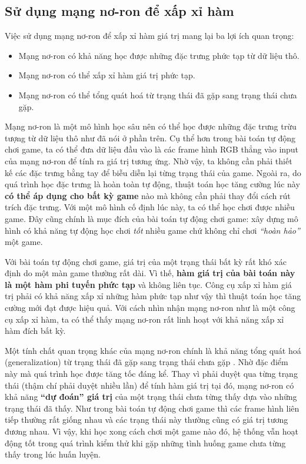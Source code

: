 \subsection{Sử dụng mạng nơ-ron để xấp xỉ hàm}
	Việc sử dụng mạng nơ-ron để xấp xỉ hàm giá trị mang lại ba lợi ích quan trọng:
	\begin{itemize}
		\item Mạng nơ-ron có khả năng học được những đặc trưng phức tạp từ dữ liệu thô.
		\item Mạng nơ-ron có thể xấp xỉ hàm giá trị phức tạp.
		\item Mạng nơ-ron có thể tổng quát hoá từ trạng thái đã gặp sang trạng thái chưa gặp.
	\end{itemize}
	
	Mạng nơ-ron là một mô hình học sâu nên có thể học được những đặc trưng trừu tượng từ dữ liệu thô như đã nói ở phần trên.
	Cụ thể hơn trong bài toán tự động chơi game, ta có thể đưa dữ liệu đầu vào là các frame hình RGB thẳng vào input của mạng nơ-ron để tính ra giá trị tương ứng.
	Nhờ vậy, ta không cần phải thiết kế các đặc trưng bằng tay để biễu diễn lại từng trạng thái của game.
	Ngoài ra, do quá trình học đặc trưng là hoàn toàn tự động, thuật toán học tăng cường lúc này \textbf{có thể áp dụng cho bất kỳ game} nào mà không cần phải thay đổi cách rút trích đặc trưng.
	Với một mô hình cố định lúc này, ta có thể học chơi được nhiều game.
	Đây cũng chính là mục đích của bài toán tự động chơi game: xây dựng mô hình có khả năng tự động học chơi \textit{tốt} nhiều game chứ không chỉ chơi \textit{``hoàn hảo''} một game.
	
	Với bài toán tự động chơi game, giá trị của một trạng thái bất kỳ rất khó xác định do một màn game thường rất dài.
	Vì thế, \textbf{hàm giá trị của bài toán này là một hàm phi tuyến phức tạp} và không liên tục.
	Công cụ xấp xỉ hàm giá trị phải có khả năng xấp xỉ những hàm phức tạp như vậy thì thuật toán học tăng cường mới đạt được hiệu quả.
	Với cách nhìn nhận mạng nơ-ron như là một công cụ xấp xỉ hàm, ta có thể thấy mạng nơ-ron rất linh hoạt với khả năng xấp xỉ hàm đích bất kỳ.
	
	Một tính chất quan trọng khác của mạng nơ-ron chính là khả năng tổng quát hoá (generalization) từ trạng thái đã gặp sang trạng thái chưa gặp \cite{mnihdqn2015}.
	Nhờ đặc điểm này mà quá trình học được tăng tốc đáng kể.
	Thay vì phải duyệt qua từng trạng thái (thậm chí phải duyệt nhiều lần) để tính hàm giá trị tại đó, mạng nơ-ron có khả năng \textbf{``dự đoán'' giá trị} của một trạng thái chưa từng thấy dựa vào những trạng thái đã thấy.
	Như trong bài toán tự động chơi game thì các frame hình liên tiếp thường rất giống nhau và các trạng thái này thường cũng có giá trị tương đương nhau.
	Vì vậy, khi học xong cách chơi một game nào đó, hệ thống vẫn hoạt động tốt trong quá trình kiểm thử khi gặp những tình huống game chưa từng thấy trong lúc huấn luyện.
	
